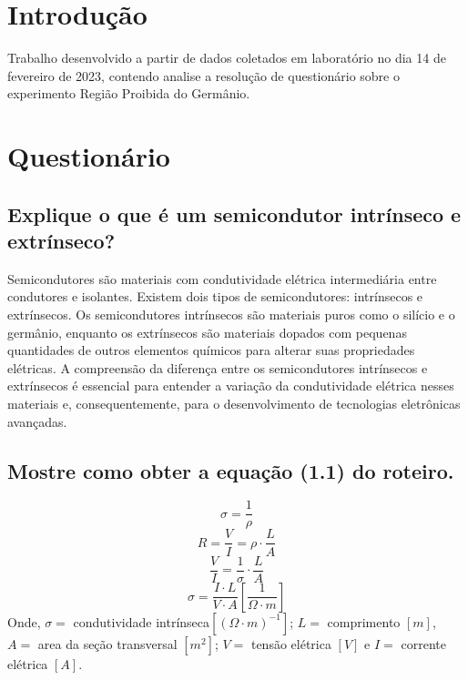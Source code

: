 
\section{Introdução}

Trabalho desenvolvido a partir de dados coletados em laboratório no dia 14 de fevereiro de 2023, contendo analise a resolução de questionário sobre o experimento Região Proibida do Germânio.

\section{Questionário}
\subsection{Explique o que é um semicondutor intrínseco e extrínseco?}
Semicondutores são materiais com condutividade elétrica intermediária entre condutores e isolantes. Existem dois tipos de semicondutores: intrínsecos e extrínsecos. Os semicondutores intrínsecos são materiais puros como o silício e o germânio, enquanto os extrínsecos são materiais dopados com pequenas quantidades de outros elementos químicos para alterar suas propriedades elétricas. A compreensão da diferença entre os semicondutores intrínsecos e extrínsecos é essencial para entender a variação da condutividade elétrica nesses materiais e, consequentemente, para o desenvolvimento de tecnologias eletrônicas avançadas.

\subsection{Mostre como obter a equação (1.1) do roteiro.}

 \begin{equation}  \sigma = \frac{1}{\rho} \label{eq1}\end{equation}
 \begin{equation} R = \frac{V}{I} = \rho \cdot \frac{L}{A} \label{eq2}\end{equation}
\begin{equation} \frac{V}{I} =\frac{1}{\sigma} \cdot \frac{L}{A}\label{eq3}\end{equation}
 \begin{equation} \sigma = \frac{I \cdot L}{V\cdot A} \left[\frac{1}{\Omega\cdot m}\right]\label{eq4}\end{equation}
 Onde,  $\sigma =$ condutividade intrínseca$\left [ {\left(\Omega\cdot m\right)}^{-1} \right ]$; $L=$ comprimento $\left[m\right]$, $A=$ area da seção transversal $\left[m^2\right]$; $V=$ tensão elétrica $\left[V\right]$ e $I=$ corrente elétrica $\left[A\right]$.


